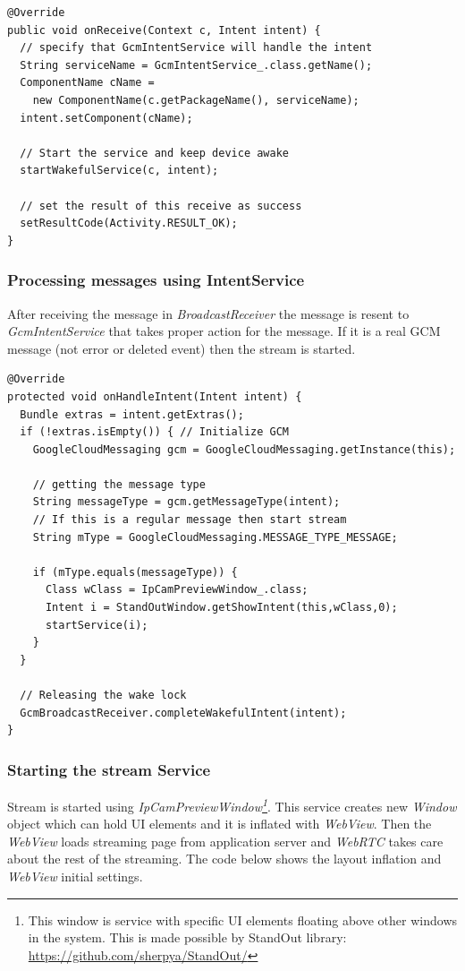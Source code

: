 \begin{lstlisting}
@Override
public void onReceive(Context c, Intent intent) {
  // specify that GcmIntentService will handle the intent
  String serviceName = GcmIntentService_.class.getName();
  ComponentName cName = 
    new ComponentName(c.getPackageName(), serviceName); 
  intent.setComponent(cName);

  // Start the service and keep device awake
  startWakefulService(c, intent);

  // set the result of this receive as success
  setResultCode(Activity.RESULT_OK);
}
\end{lstlisting}

\subsubsection{Processing messages using IntentService}
After receiving the message in \textit{BroadcastReceiver} the message is resent to \textit{GcmIntentService} that takes proper action for the message. If it is a real GCM message (not error or deleted event) then the stream is started.
\begin{lstlisting}
@Override
protected void onHandleIntent(Intent intent) {
  Bundle extras = intent.getExtras();
  if (!extras.isEmpty()) { // Initialize GCM
    GoogleCloudMessaging gcm = GoogleCloudMessaging.getInstance(this);

    // getting the message type
    String messageType = gcm.getMessageType(intent);
    // If this is a regular message then start stream
    String mType = GoogleCloudMessaging.MESSAGE_TYPE_MESSAGE;

    if (mType.equals(messageType)) {
      Class wClass = IpCamPreviewWindow_.class;
      Intent i = StandOutWindow.getShowIntent(this,wClass,0);
      startService(i);
    }
  }

  // Releasing the wake lock
  GcmBroadcastReceiver.completeWakefulIntent(intent);
}
\end{lstlisting}

\subsubsection{Starting the stream Service}
Stream is started using \textit{IpCamPreviewWindow\footnote{This window is service with specific UI elements floating above other windows in the system. This is made possible by StandOut library: \url{https://github.com/sherpya/StandOut/}}}. This service creates new \textit{Window} object which can hold UI elements and it is inflated with \textit{WebView}. Then the \textit{WebView} loads streaming page from application server and \textit{WebRTC} takes care about the rest of the streaming. The code below shows the layout inflation and \textit{WebView} initial settings.

